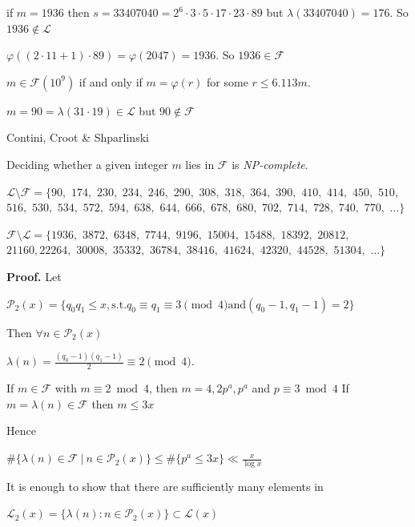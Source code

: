 \documentclass[landscape]{powersem} %
\newcommand{\matitablu}{\textcolor{MidnightBlue}{\ding{46}}}
\newcommand{\heading}[1]{%
 \begin{center}
  \large\bf
  \shadowbox{{\textcolor{conceptcolor}{#1}}}%
 \end{center}
 \vspace{1ex minus 1ex}}
\begin{document}
\begin{slide}
\heading{Image of $\varphi$ vs image of $\lambda$ - Numerical Examples\qquad (2/2)}\pause

\matitablu if
$m=1936$ then  $s=33407040=2^6\cdot3\cdot5\cdot17\cdot23\cdot89$\pause
 \hfill but $\lambda(33407040)=176$. So $1936\not\in\mathcal L$\pause

\matitablu $\varphi((2\cdot 11+1)\cdot 89)=\varphi(2047)=1936$. So $1936\in\mathcal F$\pause

\matitablu  $m\in\mathcal F(10^9)$ if and only if $m=\varphi (r)$ for some
$r\le 6.113m$.\pause

\matitablu $m=90=\lambda(31\cdot19)\in\mathcal L$ but $90\not\in\mathcal F$\pause

\matitablu \textcolor{OliveGreen}{Contini, Croot \& Shparlinski}

\qquad\qquad Deciding whether a given integer $m$ lies in $\mathcal F$ is
{\it NP-complete\/}.\pause


\matitablu $\mathcal L\setminus\mathcal F=\{ 90,$ $174,$ $230,$ $234,$ $246,$ $290,$ $308,$ $318,$ $364,$ $390,$ $410,$ $414,$
$450,$ $510,$ $516,$ $530,$ $534,$ $572,$ $594,$ $638,$ $644,$ $666,$ $678,$ $680,$ $702,$ $714,$ $728,$ $740,$ $770,$
$\ldots\}$\pause

\matitablu $\mathcal F\setminus\mathcal L=\{
1936,$ $3872,$ $6348,$ $7744,$ $9196,$ $15004,$ $15488,$ $18392,$ $20812,$ $21160,
22264,$ $30008,$ $35332,$ $36784,$ $38416,$ $41624,$ $42320,$ $44528,$ $51304,$ %
$\ldots \}$

\end{slide}

\begin{slide}
\heading{Proof of a weaker statement}\pause

 \centerline{}\pause

\noindent\textbf{Proof.} Let
\centerline{$\mathcal P_2(x)=\{q_0q_1\le x,  \text{s.t.} q_0\equiv q_1\equiv3 \pmod 4 \text{and} (q_0-1,q_1-1)=2\}$}\pause
Then $\forall n\in\mathcal P_2(x)$
\centerline{$
\lambda(n) = \frac{(q_0-1)(q_1-1)}{2} \equiv 2 \pmod 4.
$}\pause

If $m\in\mathcal F$ with $m\equiv2\bmod 4$, then
$m=4,2p^a,p^a$ and $p\equiv3\bmod4$ \pause
If $m=\lambda(n)\in\mathcal F$ then $m\leq 3x$\pause

Hence
\centerline{$\displaystyle{\#\{\lambda(n)\in\mathcal F\ |\ n\in\mathcal P_2(x)\}
\leq \#\{p^a\leq 3x\}
\ll \frac x{\log x}}$}\pause
It is enough to show that there are sufficiently many elements in
\centerline{$\displaystyle{
\mathcal{L}_2(x)=\{\lambda(n):n\in{\mathcal P}
_2(x)\}\subset\mathcal{L}(x)
}$}
\end{slide}
\end{document}
